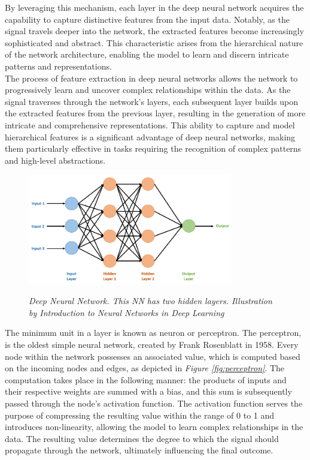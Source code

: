 By leveraging this mechanism, each layer in the deep neural network acquires the capability to capture distinctive features from the input data. Notably, as the signal travels deeper into the network, the extracted features become increasingly sophisticated and abstract. This characteristic arises from the hierarchical nature of the network architecture, enabling the model to learn and discern intricate patterns and representations. \\

The process of feature extraction in deep neural networks allows the network to progressively learn and uncover complex relationships within the data. As the signal traverses through the network's layers, each subsequent layer builds upon the extracted features from the previous layer, resulting in the generation of more intricate and comprehensive representations. This ability to capture and model hierarchical features is a significant advantage of deep neural networks, making them particularly effective in tasks requiring the recognition of complex patterns and high-level abstractions.

\begin{figure}[H]
\centering
\includegraphics[width=0.8\textwidth]{imatges/preliminaries/deep-neural-network.png}
\caption[Deep Neural Network]{\textit{Deep Neural Network. This NN has two hidden layers. Illustration by Introduction to Neural Networks in Deep Learning}}
{\label{fig:deep-nn}}
\end{figure}

The minimum unit in a layer is known as neuron or perceptron.
The perceptron, is the oldest simple neural network, created by Frank Rosenblatt in 1958.
Every node within the network possesses an associated value, which is computed based on the incoming nodes and edges,
as depicted in \textit{Figure \ref{fig:perceptron}}. The computation takes place in the following manner: the products
of  inputs and their respective weights are summed with a bias, and this sum is subsequently passed through the node's activation function.
The activation function serves the purpose of compressing the resulting value within the range of 0 to 1 and introduces non-linearity,
allowing the model to learn complex relationships in the data. The resulting value determines the
degree to which the signal should propagate through the network, ultimately influencing the final outcome.

